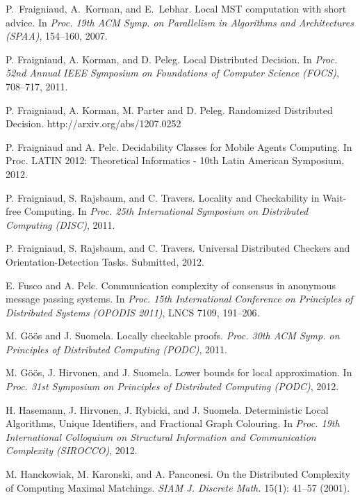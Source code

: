 \documentclass{llncs}
\begin{document}
\begin{thebibliography}{99}
P.~Fraigniaud, A.~Korman, and E.~Lebhar.
\newblock Local MST computation with short advice.
\newblock In \emph{Proc. 19th ACM Symp. on Parallelism in Algorithms
and Architectures (SPAA)}, 154--160, 2007.

P. Fraigniaud, A. Korman, and D. Peleg.
\newblock Local Distributed Decision.
\newblock In \emph{Proc. 52nd Annual IEEE Symposium
on Foundations of Computer Science (FOCS)}, 708--717, 2011.

P. Fraigniaud, A. Korman, M. Parter and D. Peleg.
\newblock Randomized Distributed Decision.
\newblock  http://arxiv.org/abs/1207.0252

P. Fraigniaud and A. Pelc.
\newblock Decidability Classes for Mobile Agents Computing.
\newblock In {Proc. LATIN 2012: Theoretical Informatics - 10th Latin American Symposium}, 2012.

P. Fraigniaud, S. Rajsbaum, and C. Travers.
\newblock Locality and  Checkability  in Wait-free Computing.
\newblock In \emph{Proc. 25th International Symposium on Distributed Computing (DISC)}, 2011.

P. Fraigniaud, S. Rajsbaum, and C. Travers.
\newblock Universal Distributed Checkers and Orientation-Detection Tasks.
\newblock Submitted, 2012.

E. Fusco and A. Pelc. 
\newblock Communication complexity of consensus in anonymous message passing systems. 
\newblock In \emph{Proc. 15th International Conference on Principles of Distributed Systems (OPODIS 2011)}, LNCS 7109, 191--206.

M. G\"o\"os and J. Suomela.
\newblock Locally checkable proofs.
\newblock \emph{Proc. 30th ACM Symp. on Principles of Distributed Computing (PODC)}, 2011.

M. G\"o\"os, J. Hirvonen, and J. Suomela.
\newblock Lower bounds for local approximation. 
\newblock In \emph{Proc. 31st Symposium on Principles of Distributed Computing (PODC)}, 2012.

H. Hasemann, J. Hirvonen, J. Rybicki, and J. Suomela. 
\newblock Deterministic Local Algorithms, Unique Identifiers, and Fractional Graph Colouring.
\newblock In \emph{Proc. 19th International Colloquium on Structural Information and Communication Complexity (SIROCCO)}, 2012.

M. Hanckowiak, M. Karonski, and A. Panconesi.
\newblock  On the Distributed Complexity of Computing Maximal Matchings.
\newblock \emph{SIAM J. Discrete Math.} 15(1): 41--57 (2001).


\end{thebibliography}
\end{document}
